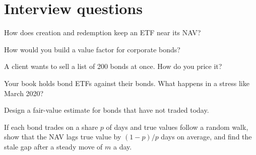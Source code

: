 \section{Interview questions}

\begin{interviewq}\label{iq:s2:systematic-credit-and-bond-etf-arbitrage:1}
How does creation and redemption keep an ETF near its NAV?
\end{interviewq}

\begin{interviewq}\label{iq:s2:systematic-credit-and-bond-etf-arbitrage:2}
How would you build a value factor for corporate bonds?
\end{interviewq}

\begin{interviewq}\label{iq:s2:systematic-credit-and-bond-etf-arbitrage:3}
A client wants to sell a list of 200 bonds at once. How do you price it?
\end{interviewq}

\begin{interviewq}\label{iq:s2:systematic-credit-and-bond-etf-arbitrage:4}
Your book holds bond ETFs against their bonds. What happens in a stress like March 2020?
\end{interviewq}

\begin{interviewq}\label{iq:s2:systematic-credit-and-bond-etf-arbitrage:5}
Design a fair-value estimate for bonds that have not traded today.
\end{interviewq}

\begin{interviewq}\label{iq:s2:systematic-credit-and-bond-etf-arbitrage:6}
If each bond trades on a share $p$ of days and true values follow a random walk, show that the NAV lags true value by $(1 - p)/p$ days on average,
and find the stale gap after a steady move of $m$ a day.
\end{interviewq}
